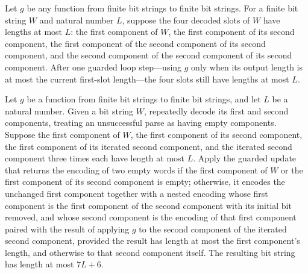 \begin{theorem}
\label{Complexity.BinArith.slotsLe_guardLoop}
\leanok
{}
Let $g$ be any function from finite bit strings to finite bit strings. For a finite bit
string $W$ and natural number $L$, suppose the four decoded slots of $W$ have lengths at
most $L$: the first component of $W$, the first component of its second component, the
first component of the second component of its second component, and the second
component of the second component of its second component. After one guarded loop
step—using $g$ only when its output length is at most the current first-slot length—the
four slots still have lengths at most $L$.
\end{theorem}

\begin{theorem}
\label{Complexity.BinArith.length_guardLoop_le}
\leanok
{}
Let $g$ be a function from finite bit strings to finite bit strings, and let $L$ be a
natural number. Given a bit string $W$, repeatedly decode its first and second
components, treating an unsuccessful parse as having empty components. Suppose the first
component of $W$, the first component of its second component, the first component of
its iterated second component, and the iterated second component three times each have
length at most $L$. Apply the guarded update that returns the encoding of two empty
words if the first component of $W$ or the first component of its second component is
empty; otherwise, it encodes the unchanged first component together with a nested
encoding whose first component is the first component of the second component with its
initial bit removed, and whose second component is the encoding of that first component
paired with the result of applying $g$ to the second component of the iterated second
component, provided the result has length at most the first component's length, and
otherwise to that second component itself. The resulting bit string has length at most
$7L+6$.
\end{theorem}

